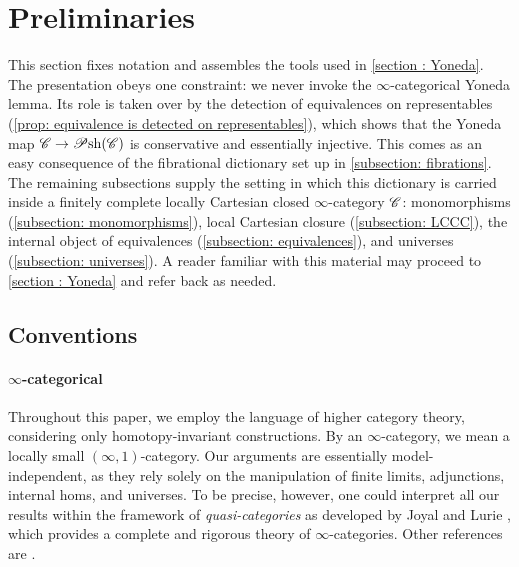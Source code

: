 \documentclass[twoside,a4paper,11pt]{amsart}
\begin{document}
\section{Preliminaries}\label{section : preliminaries}
This section fixes notation and assembles the tools used in \cref{section : Yoneda}. The presentation obeys one constraint: we never invoke the $\infty$-categorical Yoneda lemma. Its role is taken over by the detection of equivalences on representables (\cref{prop: equivalence is detected on representables}), which shows that the Yoneda map $\mathscr{C}\to\mathscr{P}\mathrm{sh}(\mathscr{C})$ is conservative and essentially injective. This comes as an easy consequence of the fibrational dictionary set up in \cref{subsection: fibrations}. The remaining subsections supply the setting in which this dictionary is carried inside a finitely complete locally Cartesian closed $\infty$-category $\mathscr{C}$: monomorphisms (\cref{subsection: monomorphisms}), local Cartesian closure (\cref{subsection: LCCC}), the internal object of equivalences (\cref{subsection: equivalences}), and universes (\cref{subsection: universes}). A reader familiar with this material may proceed to \cref{section : Yoneda} and refer back as needed.
\subsection{Conventions}
\paragraph{\textbf{$\infty$-categorical}}
Throughout this paper, we employ the language of higher category theory, considering only homotopy-invariant constructions. By an $\infty$-category, we mean a locally small $(\infty, 1)$-category. Our arguments are essentially model-independent, as they rely solely on the manipulation of finite limits, adjunctions, internal homs, and universes. To be precise, however, one could interpret all our results within the framework of \emph{quasi-categories} as developed by Joyal \cite{Joyal_QuasiCategoriesAndKanComplexes} and Lurie \cite{LurieHTT}, which provides a complete and rigorous theory of $\infty$-categories. Other references are \cite{Cisinski_HigherCategoriesAndHomotopicalAlgebra, RiehlVerity_ElementsOfInftyCategoryTheory}.

\medskip
\end{document}
